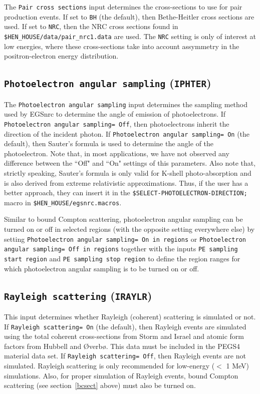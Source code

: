 \documentclass[12pt,twoside]{article}      %
\begin{document}
The {\tt Pair cross sections} input determines the cross-sections to
use for pair production events.  If set to {\tt BH} (the default), then
Bethe-Heitler cross sections are used.  If set to {\tt NRC}, then the
NRC cross sections found in {\tt \$HEN\_HOUSE/data/pair\_nrc1.data} are
used.  The {\tt NRC} setting is only of interest at low energies, where
these cross-sections take into account assymmetry in the positron-electron
energy distribution.

\subsection{{\tt Photoelectron angular sampling} ({\tt IPHTER})}

The {\tt Photoelectron angular sampling} input determines the sampling method
used by EGSnrc to determine the angle of emission of photoelectrons.
If {\tt Photoelectron angular sampling= Off}, then
 photoelectrons inherit the direction of the incident photon.  If
{\tt Photoelectron angular sampling= On} (the default), then Sauter's formula
\cite{Sa31} is used to determine the angle of the photoelectron.  Note
that, in most applications, we have not observed any difference between
the ``Off" and ``On" settings of this parameters.  Also note that,
strictly speaking, Sauter's formula is only valid for K-shell photo-absorption
and is also derived from extreme relativistic approximations.  Thus, if
the user has a better approach, they can insert it in the
{\tt \$SELECT-PHOTOELECTRON-DIRECTION;} macro in
{\tt \$HEN\_HOUSE/egsnrc.macros}.

Similar to bound Compton scattering, photoelectron angular sampling
can be turned on or off in selected regions (with the opposite setting
everywhere else) by setting
{\tt Photoelectron angular sampling= On in regions} or
{\tt Photoelectron angular sampling= Off in regions} together with
the inputs {\tt PE sampling start region} and
{\tt PE sampling stop region} to define the region ranges for which
photoelectron angular sampling is to be turned on or off.

\subsection{{\tt Rayleigh scattering} ({\tt IRAYLR})}
\label{rayleighsect}

This input determines whether Rayleigh (coherent) scattering is
simulated or not.
If {\tt Rayleigh scattering= On} (the default), then Rayleigh events are simulated
using the total coherent cross-sections from Storm and
Israel\cite{SI70} and atomic form factors from Hubbell and {\O}verb{\o}\cite{HO79}.
This data must be included in the PEGS4 material data set.
If {\tt Rayleigh scattering= Off}, then Rayleigh
events are not simulated.  Rayleigh scattering is only recommended for
low-energy ($<$ 1 MeV) simulations.  Also, for proper simulation
of Rayleigh events, bound Compton scattering (see section~\ref{bcsect} above)
must also be turned on.
\end{document}
